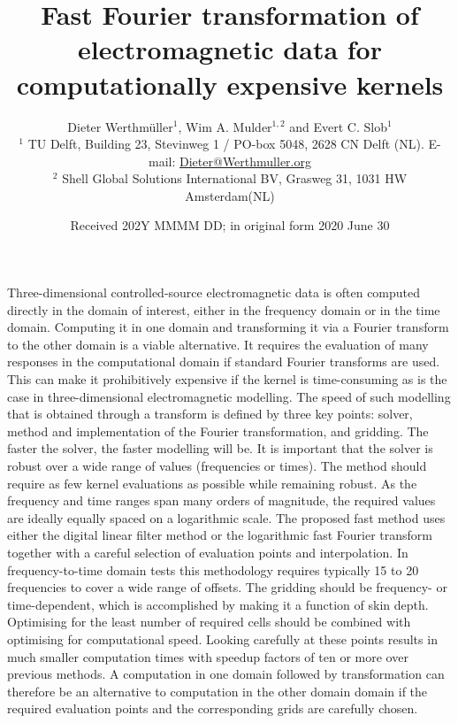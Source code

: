 \documentclass[extra, camera,%
    onecolumn,   %
    referee,     %
]{gji}
\title[Transforming expensive EM kernels]{Fast Fourier transformation of
electromagnetic data for computationally expensive kernels}
\author[D. Werthmüller \emph{et al.}]
  {\Large
   Dieter Werthmüller$^1$,     %
   Wim A. Mulder$^{1,2}$ and   %
   Evert C. Slob$^1$           %
   \\
   {\footnotesize
    $^1$ TU Delft, Building 23, Stevinweg 1 / PO-box 5048, 2628 CN Delft (NL).
    E-mail: \href{mailto:Dieter@Werthmuller.org}{Dieter@Werthmuller.org}
   }\\[-.3em]
   {\footnotesize
    $^2$ Shell Global Solutions International BV, Grasweg 31, 1031 HW
    Amsterdam(NL)
   }
  }
\date{Received 202Y MMMM DD; in original form 2020 June 30}
\makeatletter
\let\zz@tabular\@tabular
\let\zzendtabular\endtabular
\let\zz@xtabularcr\@xtabularcr
\let\zz@tabclassz\@tabclassz
\let\zz@tabclassiv \@tabclassiv
\let\zz@tabarray\@tabarray
\makeatother
\begin{document}
\label{firstpage}

{\makeatletter
\let\@tabular\zz@tabular
\let\endtabular\zzendtabular
\let\@xtabularcr\zz@xtabularcr
\let\@tabclassz\zz@tabclassz
\let\@tabclassiv \zz@tabclassiv 
\let\@tabarray\zz@tabarray
\maketitle
}

\begin{summary}
%
Three-dimensional controlled-source electromagnetic data is often computed
directly in the domain of interest, either in the frequency domain or in the
time domain. Computing it in one domain and transforming it via a Fourier
transform to the other domain is a viable alternative. It requires the
evaluation of many responses in the computational domain if standard Fourier
transforms are used. This can make it prohibitively expensive if the kernel is
time-consuming as is the case in three-dimensional electromagnetic modelling.
The speed of such modelling that is obtained through a transform is defined by
three key points: solver, method and implementation of the Fourier
transformation, and gridding.
%
The faster the solver, the faster modelling will be. It is important that the
solver is robust over a wide range of values (frequencies or times). The method
should require as few kernel evaluations as possible while remaining robust. As
the frequency and time ranges span many orders of magnitude, the required
values are ideally equally spaced on a logarithmic scale. The proposed fast
method uses either the digital linear filter method or the logarithmic fast
Fourier transform together with a careful selection of evaluation points and
interpolation. In frequency-to-time domain tests this methodology requires
typically 15 to 20 frequencies to cover a wide range of offsets.
%
The gridding should be frequency- or time-dependent, which is accomplished by
making it a function of skin depth. Optimising for the least number of required
cells should be combined with optimising for computational speed. Looking
carefully at these points results in much smaller computation times with
speedup factors of ten or more over previous methods. A computation in one
domain followed by transformation can therefore be an alternative to
computation in the other domain domain if the required evaluation points and
the corresponding grids are carefully chosen.
%
\end{summary}
\end{document}

